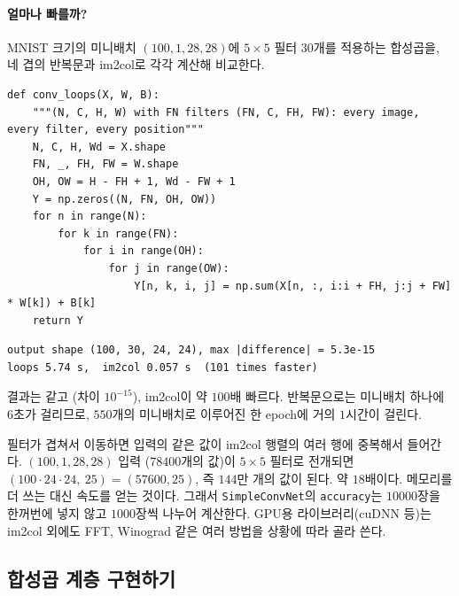\documentclass[11pt,a4paper]{article}
\begin{document}
\paragraph{얼마나 빠를까?}
MNIST 크기의 미니배치 $(100,1,28,28)$에 $5\times5$ 필터 $30$개를 적용하는 합성곱을,
네 겹의 반복문과 im2col로 각각 계산해 비교한다.
\begin{lstlisting}
def conv_loops(X, W, B):
    """(N, C, H, W) with FN filters (FN, C, FH, FW): every image, every filter, every position"""
    N, C, H, Wd = X.shape
    FN, _, FH, FW = W.shape
    OH, OW = H - FH + 1, Wd - FW + 1
    Y = np.zeros((N, FN, OH, OW))
    for n in range(N):
        for k in range(FN):
            for i in range(OH):
                for j in range(OW):
                    Y[n, k, i, j] = np.sum(X[n, :, i:i + FH, j:j + FW] * W[k]) + B[k]
    return Y
\end{lstlisting}
\begin{lstlisting}[language={},numbers=none]
output shape (100, 30, 24, 24), max |difference| = 5.3e-15
loops 5.74 s,  im2col 0.057 s  (101 times faster)
\end{lstlisting}
결과는 같고 (차이 $10^{-15}$), im2col이 약 $100$배 빠르다.
반복문으로는 미니배치 하나에 $6$초가 걸리므로, $550$개의 미니배치로 이루어진 한 epoch에 거의 $1$시간이 걸린다.

\begin{remarkbox}
필터가 겹쳐서 이동하면 입력의 같은 값이 im2col 행렬의 여러 행에 중복해서 들어간다.
$(100,1,28,28)$ 입력 ($78400$개의 값)이 $5\times5$ 필터로 전개되면
$(100\cdot24\cdot24,\ 25)=(57600,25)$, 즉 $144$만 개의 값이 된다. 약 $18$배이다.
메모리를 더 쓰는 대신 속도를 얻는 것이다.
그래서 \texttt{SimpleConvNet}의 \texttt{accuracy}는 $10000$장을 한꺼번에 넣지 않고 $1000$장씩 나누어 계산한다.
GPU용 라이브러리(cuDNN 등)는 im2col 외에도 FFT, Winograd 같은 여러 방법을 상황에 따라 골라 쓴다.
\end{remarkbox}

\subsection{합성곱 계층 구현하기}\label{sec:convlayer}
\end{document}
